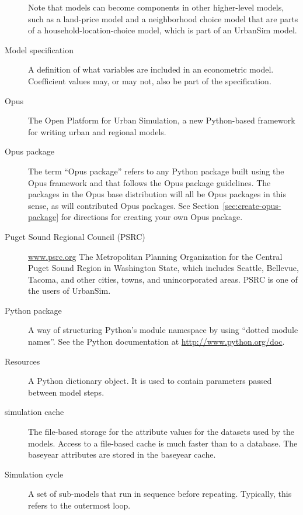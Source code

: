 \begin{description}
Note that models can become components in other higher-level models, such as a
land-price model and a neighborhood choice model that are parts of a
household-location-choice model, which is part of an UrbanSim model.

\item[Model specification] 
A definition of what variables are included in an econometric
model.  Coefficient \coefficientsindex values may, or may not, also be part of the
specification.

\item[Opus]  The Open Platform for Urban Simulation, a new
Python-based \pythonindex framework for writing urban and regional models.

\item[Opus package]  The term ``Opus package'' refers to 
any Python \pythonindex package built using the Opus framework and that follows
the Opus package guidelines.  The packages in the Opus base distribution
will all be Opus packages in this sense, as will contributed Opus packages. See
Section~\ref{sec:create-opus-package} for directions for creating your own Opus
package. 

\item[Puget Sound Regional Council (PSRC)]
\url{www.psrc.org}
The Metropolitan Planning Organization for the Central Puget Sound Region in Washington
State, which includes Seattle, Bellevue, Tacoma, and other cities, towns, and unincorporated 
areas.  PSRC is one of the users of UrbanSim. 

\item[Python package]
A way of structuring Python's module namespace by using ``dotted module
names''.  See the Python documentation at \url{http://www.python.org/doc}.

\item[Resources]  
A Python \pythonindex dictionary object.  It is used to contain parameters passed
between model steps.

\item[simulation cache]
The file-based storage for the attribute values for the datasets \datasetindex used by the
models. Access to a file-based cache is much faster than to a database.  The
baseyear attributes \attributesindex are stored in the baseyear cache. \baseyearcacheindex

\item[]\item[Simulation cycle] 
A set of sub-models that run in sequence before repeating.
Typically, this refers to the outermost loop.


\end{description}
